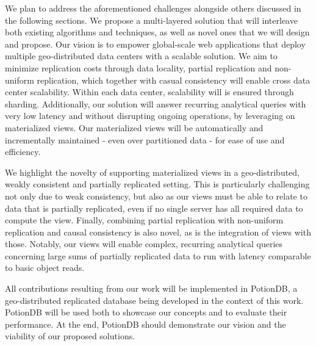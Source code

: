 We plan to address the aforementioned challenges alongside others discussed in the following sections.
We propose a multi-layered solution that will interleave both existing algorithms and techniques, as well as novel ones that we will design and propose.
Our vision is to empower global-scale web applications that deploy multiple geo-distributed data centers with a scalable solution.
We aim to minimize replication costs through data locality, partial replication and non-uniform replication, which together with casual consistency will enable cross data center scalability.
Within each data center, scalability will is ensured through sharding.
Additionally, our solution will answer recurring analytical queries with very low latency and without disrupting ongoing operations, by leveraging on materialized views.
Our materialized views will be automatically and incrementally maintained - even over partitioned data -  for ease of use and efficiency.



We highlight the novelty of supporting materialized views in a geo-distributed, weakly consistent and partially replicated setting.
This is particularly challenging not only due to weak consistency, but also as our views must be able to relate to data that is partially replicated, 
even if no single server has all required data to compute the view.
Finally, combining partial replication with non-uniform replication and causal consistency is also novel, as is the integration of views with those.
Notably, our views will enable complex, recurring analytical queries concerning large sums of partially replicated data to run with latency comparable to basic object reads.

All contributions resulting from our work will be implemented in PotionDB, a geo-distributed replicated database being developed in the context of this work.
PotionDB will be used both to showcase our concepts  and to evaluate their performance.
At the end, PotionDB should demonstrate our vision and the viability of our proposed solutions.

